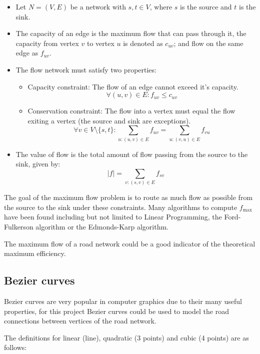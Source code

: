         \begin{itemize}
            \item Let $N = (V,E)$ be a network with $s, t \in V$, where $s$ is the source and $t$ is the sink.
            \item The capacity of an edge is the maximum flow that can pass through it, the capacity from vertex $v$ to vertex $u$ is denoted as $c_{uv}$; and flow on the same edge as $f_{uv}$.
            \item The flow network must satisfy two properties:
            \begin{itemize}
                \item Capacity constraint: The flow of an edge cannot exceed it's capacity. \[\forall (u, v) \in E : f_{uv} \leq c_{uv}\]
                \item Conservation constraint: The flow into a vertex must equal the flow exiting a vertex (the source and sink are exceptions).
                \[\forall v \in V \setminus \{s, t\} : \sum_{u : (u, v) \in E} f_{uv} = \sum_{u : (v, u) \in E} f_{vu}\]
            \end{itemize}
            \item The value of flow is the total amount of flow passing from the source to the sink, given by:
            \[|f| = \sum_{v : (s, v) \in E} f_{sv}\]
        \end{itemize}

        The goal of the maximum flow problem is to route as much flow as possible from the source to the sink under these constraints. Many algorithms to compute $f_\text{max}$ have been found including but not limited to Linear Programming, the Ford-Fulkerson algorithm or the Edmonds-Karp algorithm.

        The maximum flow of a road network could be a good indicator of the theoretical maximum efficiency.

    \subsection{Bezier curves}
    \label{bezier}

        Bezier curves are very popular in computer graphics due to their many useful properties, for this project Bezier curves could be used to model the road connections between vertices of the road network.

        The definitions for linear (line), quadratic (3 points) and cubic (4 points) are as follows:

